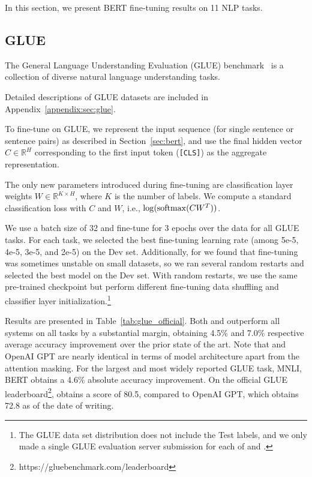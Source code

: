 In this section, we present BERT fine-tuning results on 11 NLP tasks. 

\subsection{GLUE}
\label{sec:glue}

The General Language Understanding Evaluation (GLUE) benchmark~\cite{wang-etal:2018:_glue} is a collection of diverse natural language understanding tasks.

Detailed descriptions of GLUE datasets are included in Appendix~\ref{appendix:sec:glue}.

To fine-tune on GLUE, we represent the input sequence (for single sentence or sentence pairs) as described in Section~\ref{sec:bert}, and use the final hidden vector $C \in \mathbb{R}^{H}$ corresponding to the first input token ({\tt [CLS]}) as the aggregate representation.

The only new parameters introduced during fine-tuning are  classification layer weights $W \in \mathbb{R}^{K \times H}$, where $K$ is the number of labels. We compute a standard classification loss with $C$ and $W$, i.e., $\log({\rm softmax}(CW^T))$.

We use a batch size of 32 and fine-tune for 3 epochs over the data for all GLUE tasks. For each task, we selected the best fine-tuning learning rate (among 5e-5, 4e-5, 3e-5, and 2e-5) on the Dev set. Additionally, for \bertlarge we found that fine-tuning was sometimes unstable on small datasets, so we ran several random restarts and selected the best model on the Dev set. With random restarts, we use the same pre-trained checkpoint but perform different fine-tuning data shuffling and classifier layer initialization.\footnote{The GLUE data set distribution does not include the Test labels, and we only made a single GLUE evaluation server submission for each of \bertbase and \bertlarge.}

Results are presented in Table~\ref{tab:glue_official}. Both \bertbase and \bertlarge outperform all systems on all tasks by a substantial margin, obtaining 4.5\% and 7.0\% respective average accuracy improvement over the prior state of the art. Note that \bertbase and OpenAI GPT are nearly identical in terms of model architecture apart from the attention masking. For the largest and most widely reported GLUE task, MNLI, BERT obtains a 4.6\% absolute accuracy improvement. On the official GLUE leaderboard\footnote{https://gluebenchmark.com/leaderboard},
\bertlarge obtains a score of 80.5, compared to OpenAI GPT, which obtains 72.8 as of the date of writing.

